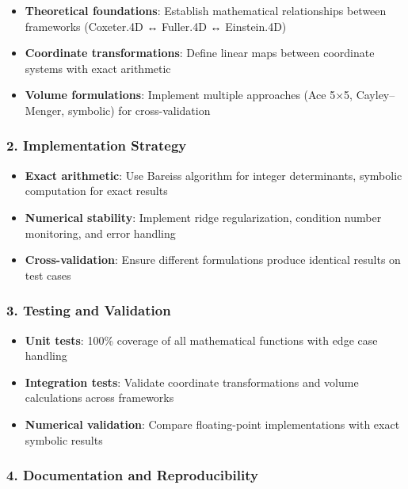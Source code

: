 \documentclass[
  10pt,
]{article}
\providecommand{\tightlist}{%
  \setlength{\itemsep}{0pt}\setlength{\parskip}{0pt}}
\begin{document}
\begin{itemize}
\tightlist
\item
  \textbf{Theoretical foundations}: Establish mathematical relationships
  between frameworks (Coxeter.4D ↔ Fuller.4D ↔ Einstein.4D)
\item
  \textbf{Coordinate transformations}: Define linear maps between
  coordinate systems with exact arithmetic
\item
  \textbf{Volume formulations}: Implement multiple approaches (Ace 5×5,
  Cayley--Menger, symbolic) for cross-validation
\end{itemize}

\subsubsection{2. Implementation
Strategy}\label{implementation-strategy-1}

\begin{itemize}
\tightlist
\item
  \textbf{Exact arithmetic}: Use Bareiss algorithm for integer
  determinants, symbolic computation for exact results
\item
  \textbf{Numerical stability}: Implement ridge regularization,
  condition number monitoring, and error handling
\item
  \textbf{Cross-validation}: Ensure different formulations produce
  identical results on test cases
\end{itemize}

\subsubsection{3. Testing and Validation}\label{testing-and-validation}

\begin{itemize}
\tightlist
\item
  \textbf{Unit tests}: 100\% coverage of all mathematical functions with
  edge case handling
\item
  \textbf{Integration tests}: Validate coordinate transformations and
  volume calculations across frameworks
\item
  \textbf{Numerical validation}: Compare floating-point implementations
  with exact symbolic results
\end{itemize}

\subsubsection{4. Documentation and
Reproducibility}\label{documentation-and-reproducibility}
\end{document}
